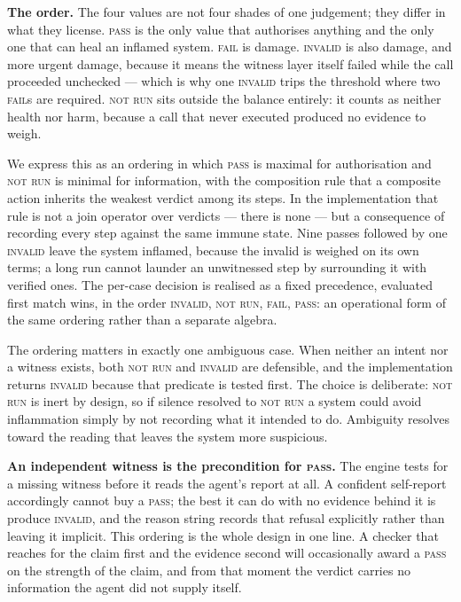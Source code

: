 \documentclass[conference]{IEEEtran}
\begin{document}
\textbf{The order.}
The four values are not four shades of one judgement; they differ in what they
license. \textsc{pass} is the only value that authorises anything and the only one
that can heal an inflamed system. \textsc{fail} is damage. \textsc{invalid} is
also damage, and more urgent damage, because it means the witness layer itself
failed while the call proceeded unchecked --- which is why one
\textsc{invalid} trips the threshold where two \textsc{fail}s are required.
\textsc{not run} sits outside the balance entirely: it counts as neither health
nor harm, because a call that never executed produced no evidence to weigh.

We express this as an ordering in which \textsc{pass} is maximal for
authorisation and \textsc{not run} is minimal for information, with the
composition rule that a composite action inherits the weakest verdict among its
steps. In the implementation that rule is not a join operator over verdicts ---
there is none --- but a consequence of recording every step against the same
immune state. Nine passes followed by one \textsc{invalid} leave the system
inflamed, because the invalid is weighed on its own terms; a long run cannot
launder an unwitnessed step by surrounding it with verified ones. The per-case
decision is realised as a fixed precedence, evaluated first match wins, in the
order \textsc{invalid}, \textsc{not run}, \textsc{fail}, \textsc{pass}: an
operational form of the same ordering rather than a separate algebra.

The ordering matters in exactly one ambiguous case. When neither an intent nor a
witness exists, both \textsc{not run} and \textsc{invalid} are defensible, and the
implementation returns \textsc{invalid} because that predicate is tested first.
The choice is deliberate: \textsc{not run} is inert by design, so if silence
resolved to \textsc{not run} a system could avoid inflammation simply by not
recording what it intended to do. Ambiguity resolves toward the reading that
leaves the system more suspicious.

\textbf{An independent witness is the precondition for \textsc{pass}.}
The engine tests for a missing witness before it reads the agent's report at all.
A confident self-report accordingly cannot buy a \textsc{pass}; the best it can do
with no evidence behind it is produce \textsc{invalid}, and the reason string
records that refusal explicitly rather than leaving it implicit. This ordering is
the whole design in one line. A checker that reaches for the claim first and the
evidence second will occasionally award a \textsc{pass} on the strength of the
claim, and from that moment the verdict carries no information the agent did not
supply itself.
\end{document}
